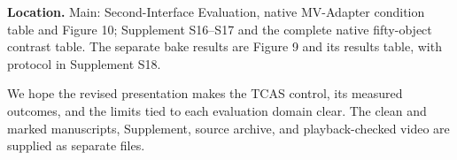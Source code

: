 \documentclass[
]{article}
\begin{document}
\textbf{Location.} Main: Second-Interface Evaluation, native MV-Adapter
condition table and Figure 10; Supplement S16--S17 and the complete
native fifty-object contrast table. The separate bake results are Figure
9 and its results table, with protocol in Supplement S18.

We hope the revised presentation makes the TCAS control, its measured
outcomes, and the limits tied to each evaluation domain clear. The clean
and marked manuscripts, Supplement, source archive, and playback-checked
video are supplied as separate files.
\end{document}
